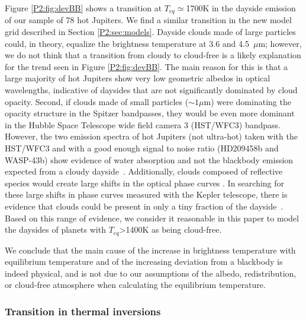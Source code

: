 Figure \ref{P2:fig:devBB} shows a transition at $T_{eq}\simeq$1700K in the dayside emission of our sample of 78 hot Jupiters. We find a similar transition in the new model grid described in Section \ref{P2:sec:models}. Dayside clouds made of large particles could, in theory, equalize the brightness temperature at 3.6 and 4.5~$\mu$m; however, we do not think that a transition from cloudy to cloud-free  is a likely explanation for the trend seen in Figure \ref{P2:fig:devBB}. The main reason for this is that a large majority of hot Jupiters show very low geometric albedos in optical wavelengths, indicative of daysides that are not significantly dominated by cloud opacity. Second, if clouds made of small particles ($\sim1\mu$m) were dominating the opacity structure in the Spitzer bandpasses, they would be even more dominant in the Hubble Space Telescope wide field camera 3 (HST/WFC3) bandpass. However, the two emission spectra of hot Jupiters (not ultra-hot) taken with the HST/WFC3 and with a good enough signal to noise ratio (HD209458b and WASP-43b) show evidence of water absorption and not the blackbody emission  expected from a cloudy dayside~\citep{Line2016a, Stevenson2014b}. Additionally, clouds composed of reflective species would create large shifts in the optical phase curves \citet{Shporer2015}. In searching for these large shifts in phase curves measured with the Kepler telescope, there is evidence that clouds could be present in only a tiny fraction of the dayside~\citep{Parmentier2016}. Based on this range of evidence, we consider it reasonable in this paper to model the daysides of planets with $T_{eq}$>1400K as being
cloud-free.%

We conclude that the main cause of the increase in brightness temperature with equilibrium temperature and of the increasing deviation from a blackbody is indeed physical, and is not due to our assumptions of the albedo, redistribution, or cloud-free atmosphere when calculating the equilibrium temperature.

\subsubsection{Transition in thermal inversions}

